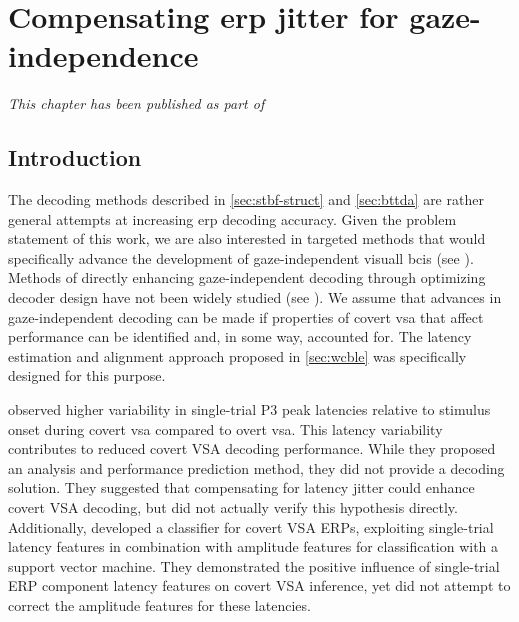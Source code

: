 \chapter{Compensating \acs{erp} jitter for gaze-independence}
\label{sec:covert-align}
\emph{This chapter has been published as part of~\textcite{VanDenKerchove2024}}

\section{Introduction}

The decoding methods described in \autoref{sec:stbf-struct} and
\autoref{sec:bttda} are rather general attempts at increasing \ac{erp} decoding accuracy.
Given the problem statement of this work, we are also interested in targeted
methods that would specifically advance the development of gaze-independent
visuall \acp{bci} (see \label{sec:gaze-independence/sota}).
Methods of directly enhancing gaze-independent decoding through optimizing
decoder design have not been widely studied (see
\label{sec:gaze-independence/sota/decoding}).
We assume that advances in gaze-independent decoding can be made if properties
of covert \ac{vsa} that affect performance can be identified and, in some way,
accounted for.
The latency estimation and alignment approach proposed in \autoref{sec:wcble}
was specifically designed for this purpose.

\textcite{Arico2014} observed higher variability in single-trial P3 peak
latencies relative to stimulus onset during covert \ac{vsa} compared to overt
\ac{vsa}.
This latency variability contributes to reduced covert VSA decoding performance.
While they proposed an analysis and performance prediction method, they did not provide a
decoding solution.
They suggested that compensating for latency jitter could enhance covert VSA
decoding, but did not actually verify this hypothesis directly.
Additionally, \cite{Hardiansyah2020} developed a classifier for
covert VSA ERPs, exploiting single-trial latency features in combination with
amplitude features for classification with a support vector machine.
They demonstrated the positive influence of single-trial ERP component latency
features on covert VSA inference, yet did not attempt to correct the amplitude
features for these latencies.

